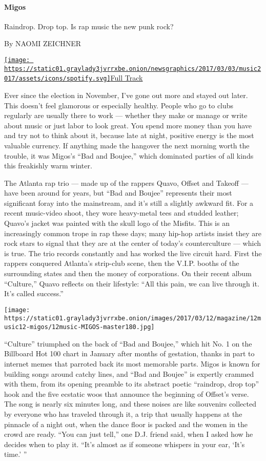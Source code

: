 \hypertarget{migos}{%
\paragraph{Migos}\label{migos}}

Raindrop. Drop top. Is rap music the new punk rock?

By NAOMI ZEICHNER

\href{https://open.spotify.com/track/4Km5HrUvYTaSUfiSGPJeQR}{\texttt{[image: https://static01.graylady3jvrrxbe.onion/newsgraphics/2017/03/03/music2017/assets/icons/spotify.svg]}Full
Track}

Ever since the election in November, I've gone out more and stayed out
later. This doesn't feel glamorous or especially healthy. People who go
to clubs regularly are usually there to work --- whether they make or
manage or write about music or just labor to look great. You spend more
money than you have and try not to think about it, because late at
night, positive energy is the most valuable currency. If anything made
the hangover the next morning worth the trouble, it was Migos's ``Bad
and Boujee,'' which dominated parties of all kinds this freakishly warm
winter.

The Atlanta rap trio --- made up of the rappers Quavo, Offset and
Takeoff --- have been around for years, but ``Bad and Boujee''
represents their most significant foray into the mainstream, and it's
still a slightly awkward fit. For a recent music-video shoot, they wore
heavy-metal tees and studded leather; Quavo's jacket was painted with
the skull logo of the Misfits. This is an increasingly common trope in
rap these days; many hip-hop artists insist they are rock stars to
signal that they are at the center of today's counterculture --- which
is true. The trio records constantly and has worked the live circuit
hard. First the rappers conquered Atlanta's strip-club scene, then the
V.I.P. booths of the surrounding states and then the money of
corporations. On their recent album ``Culture,'' Quavo reflects on their
lifestyle: ``All this pain, we can live through it. It's called
success.''

\texttt{[image: https://static01.graylady3jvrrxbe.onion/images/2017/03/12/magazine/12music12-migos/12music-MIGOS-master180.jpg]}

``Culture'' triumphed on the back of ``Bad and Boujee,'' which hit No. 1
on the Billboard Hot 100 chart in January after months of gestation,
thanks in part to internet memes that parroted back its most memorable
parts. Migos is known for building songs around catchy lines, and ``Bad
and Boujee'' is expertly crammed with them, from its opening preamble to
its abstract poetic ``raindrop, drop top'' hook and the five ecstatic
woos that announce the beginning of Offset's verse. The song is nearly
six minutes long, and these noises are like souvenirs collected by
everyone who has traveled through it, a trip that usually happens at the
pinnacle of a night out, when the dance floor is packed and the women in
the crowd are ready. ``You can just tell,'' one D.J. friend said, when I
asked how he decides when to play it. ``It's almost as if someone
whispers in your ear, `It's time.' ''


